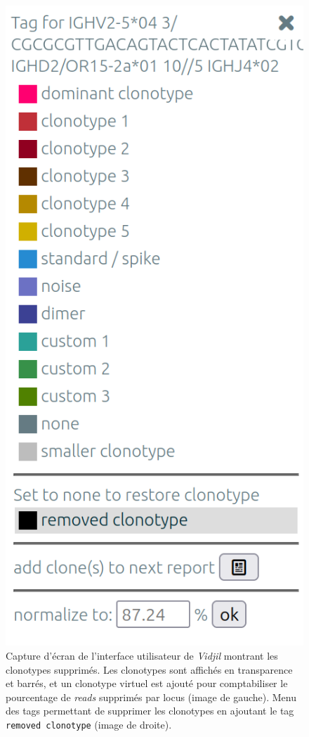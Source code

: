 \begin{figure}[H]
\begin{minipage}{0.3\textwidth}
        \includegraphics[width=01\textwidth]{images/tag_menu.png}
    \end{minipage}
    \caption{
        Capture d'écran de l'interface utilisateur de \textit{Vidjil} montrant les clonotypes supprimés.
        Les clonotypes sont affichés en transparence et barrés, et un clonotype virtuel est ajouté pour
        comptabiliser le pourcentage de \textit{reads} supprimés par locus (image de gauche).
        Menu des tags permettant de supprimer les clonotypes en ajoutant le tag \texttt{removed clonotype}
        (image de droite).
    }
    \label{fig:removed-clonotypes}
\end{figure}

